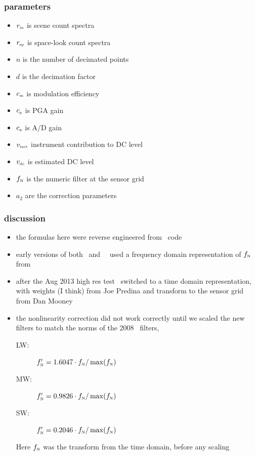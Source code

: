 \documentclass[11pt]{beamer}
\newcommand {\rin}   {r_{\mbox{\tiny in}}}
\newcommand {\rsp}   {r_{\mbox{\tiny sp}}}
\newcommand {\cm}    {c_{\mbox{\tiny m}}}
\newcommand {\cp}    {c_{\mbox{\tiny p}}}
\newcommand {\ca}    {c_{\mbox{\tiny a}}}
\newcommand {\vinst} {v_{\mbox{\tiny inst}}}
\newcommand {\vdc}   {v_{\mbox{\tiny dc}}}
\newcommand {\fn}    {f_{\mbox{\tiny N}}}
\begin{document}
\begin{frame}
\frametitle{parameters}

\begin{itemize}
  \item $\rin$ is scene count spectra
  \item $\rsp$ is space-look count spectra
  \item $n$ is the number of decimated points
  \item $d$ is the decimation factor
  \item $\cm$ is modulation efficiency
  \item $\cp$ is PGA gain 
  \item $\ca$ is A/D gain
  \item $\vinst$ instrument contribution to DC level
  \item $\vdc$ is estimated DC level
  \item $\fn$ is the numeric filter at the sensor grid
  \item $a_2$ are the correction parameters
\end{itemize}

\end{frame}
\begin{frame}
\frametitle{discussion}

\begin{itemize}
  \item the formulas here were reverse engineered from \uw\ code

  \item early versions of both \umbc\ and \uw\ \ccast\ used a
    frequency domain representation of $\fn$ from \uw

  \item after the Aug 2013 high res test \umbc\ switched to a time
    domain representation, with weights (I think) from Joe Predina
    and transform to the sensor grid from Dan Mooney
    
  \item the nonlinearity correction did not work correctly until we
    scaled the new filters to match the norms of the 2008 \uw\ filters,
    \begin{description}
      \item[\small LW:]  $\fn' = 1.6047 \cdot \fn / \max(\fn)$
      \item[\small MW:]  $\fn' = 0.9826 \cdot \fn / \max(\fn)$
      \item[\small SW:]  $\fn' = 0.2046 \cdot \fn / \max(\fn)$
    \end{description}
    Here $\fn$ was the transform from the time domain, before any
    scaling

\end{itemize}

\end{frame}
\end{document}
